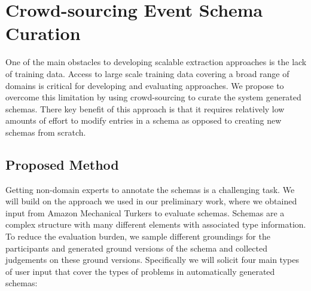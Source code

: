 \section{Crowd-sourcing Event Schema Curation}

One of the main obstacles to developing scalable extraction approaches is the lack of training data. Access to large scale training data covering a broad range of domains is critical for developing and evaluating approaches. We propose to overcome this limitation by using crowd-sourcing to curate the system generated schemas. There key benefit of this approach is that it requires relatively low amounts of effort to modify entries in a schema as opposed to creating new schemas from scratch. 



\subsection{Proposed Method}
Getting non-domain experts to annotate the schemas is a challenging task. We will build on the approach we used in our preliminary work, where we obtained input from Amazon Mechanical Turkers to evaluate schemas. Schemas are a complex structure with many different elements with associated type information. To reduce the evaluation burden, we sample different groundings for the participants and generated ground versions of the schema and collected judgements on these ground versions. 
Specifically we will solicit four main types of user input that cover the types of problems in automatically generated schemas:
